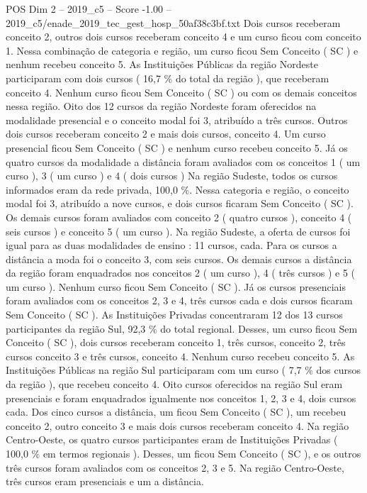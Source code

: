 \begin{textsample}{POS Dim 2 – 2019\_c5 – Score -1.00 – 2019\_c5/enade\_2019\_tec\_gest\_hosp\_50af38c3bf.txt}
Dois cursos receberam conceito 2, outros dois cursos receberam conceito 4 e um curso ficou com conceito 1.
Nessa combinação de categoria e região, um curso ficou Sem Conceito ( SC ) e nenhum recebeu conceito 5.
As Instituições Públicas da região Nordeste participaram com dois cursos ( 16,7 \% do total da região ), que receberam conceito 4.
Nenhum curso ficou Sem Conceito ( SC ) ou com os demais conceitos nessa região.
Oito dos 12 cursos da região Nordeste foram oferecidos na modalidade presencial e o conceito modal foi 3, atribuído a três cursos.
Outros dois cursos receberam conceito 2 e mais dois cursos, conceito 4.
Um curso presencial ficou Sem Conceito ( SC ) e nenhum curso recebeu conceito 5.
Já os quatro cursos da modalidade a distância foram avaliados com os conceitos 1 ( um curso ), 3 ( um curso ) e 4 ( dois cursos ) Na região Sudeste, todos os cursos informados eram da rede privada, 100,0 \%.
Nessa categoria e região, o conceito modal foi 3, atribuído a nove cursos, e dois cursos ficaram Sem Conceito ( SC ).
Os demais cursos foram avaliados com conceito 2 ( quatro cursos ), conceito 4 ( seis cursos ) e conceito 5 ( um curso ).
Na região Sudeste, a oferta de cursos foi igual para as duas modalidades de ensino : 11 cursos, cada.
Para os cursos a distância a moda foi o conceito 3, com seis cursos.
Os demais cursos a distância da região foram enquadrados nos conceitos 2 ( um curso ), 4 ( três cursos ) e 5 ( um curso ).
Nenhum curso ficou Sem Conceito ( SC ).
Já os cursos presenciais foram avaliados com os conceitos 2, 3 e 4, três cursos cada e dois cursos ficaram Sem Conceito ( SC ).
As Instituições Privadas concentraram 12 dos 13 cursos participantes da região Sul, 92,3 \% do total regional.
Desses, um curso ficou Sem Conceito ( SC ), dois cursos receberam conceito 1, três cursos, conceito 2, três cursos conceito 3 e três cursos, conceito 4.
Nenhum curso recebeu conceito 5.
As Instituições Públicas na região Sul participaram com um curso ( 7,7 \% dos cursos da região ), que recebeu conceito 4.
Oito cursos oferecidos na região Sul eram presenciais e foram enquadrados igualmente nos conceitos 1, 2, 3 e 4, dois cursos cada.
Dos cinco cursos a distância, um ficou Sem Conceito ( SC ), um recebeu conceito 2, outro conceito 3 e mais dois cursos receberam conceito 4.
Na região Centro-Oeste, os quatro cursos participantes eram de Instituições Privadas ( 100,0 \% em termos regionais ).
Desses, um ficou Sem Conceito ( SC ), e os outros três cursos foram avaliados com os conceitos 2, 3 e 5.
Na região Centro-Oeste, três cursos eram presenciais e um a distância.

\end{textsample}
